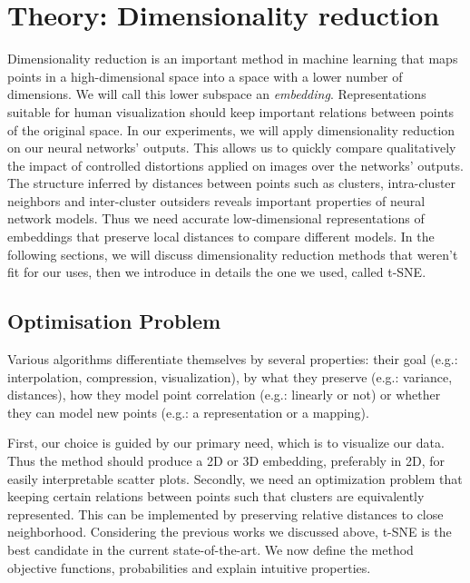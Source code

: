 \documentclass[a4paper,12pt]{report}
\newcommand{\eg}{e.g.}
\begin{document}
\chapter{Theory: Dimensionality reduction}
Dimensionality reduction is an important method in machine learning that maps points in a high-dimensional space into a space with a lower number of dimensions.
We will call this lower subspace an {\em embedding}.
Representations suitable for human visualization should keep important relations between points of the original space.
In our experiments, we will apply dimensionality reduction on our neural networks' outputs.
This allows us to quickly compare qualitatively the impact of controlled distortions applied on images over the networks' outputs.
The structure inferred by distances between points such as clusters, intra-cluster neighbors and inter-cluster outsiders reveals important properties of neural network models.
Thus we need accurate low-dimensional representations of embeddings that preserve local distances to compare different models.
In the following sections, we will discuss dimensionality reduction methods that weren't fit for our uses, then we introduce in details the one we used, called t-SNE.

\section{Optimisation Problem}
Various algorithms differentiate themselves by several properties: their goal (\eg: interpolation, compression, visualization), by what they preserve (\eg: variance, distances), how they model point correlation (\eg: linearly or not) or whether they can model new points (\eg: a representation or a mapping).

First, our choice is guided by our primary need, which is to visualize our data.
Thus the method should produce a 2D or 3D embedding, preferably in 2D, for easily interpretable scatter plots.
Secondly, we need an optimization problem that keeping certain relations between points such that clusters are equivalently represented.
This can be implemented by preserving relative distances to close neighborhood.
Considering the previous works we discussed above, t-SNE is the best candidate in the current state-of-the-art.
We now define the method objective functions, probabilities and explain intuitive properties.
\end{document}
